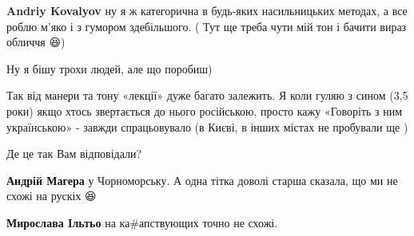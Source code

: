 \begin{itemize}
\begin{itemize}
 
\textbf{Andriy Kovalyov} ну я ж категорична в будь-яких насильницьких методах,
а все роблю м'яко і з гумором здебільшого. ( Тут ще треба чути мій тон і бачити
вираз обличчя 😆)

Ну я бішу трохи людей, але що поробиш)

 

Так від манери та тону «лекції» дуже багато залежить. Я коли гуляю з сином (3,5
роки) якщо хтось звертається до нього російською, просто кажу «Говоріть з ним
українською» - завжди спрацьовувало (в Києві, в інших містах не пробували ще \Smiley[1.0][yellow]
)

\end{itemize}

 

Де це так Вам відповідали?

\begin{itemize}
 
\textbf{Андрій Магера} у Чорноморську. А одна тітка доволі старша сказала, що ми не схожі на рускіх 😆

 

\textbf{Мирослава Ільтьо} на ка\#апствующих точно не схожі.
\end{itemize}


\end{itemize}
